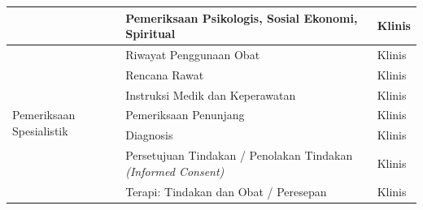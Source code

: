 \documentclass[bahasa, 12pt, a4paper, onecolumn, oneside, final]{report}
\begin{document}
\begin{longtable}{|p{4cm}|p{5.2cm}|p{3.2cm}|}
	                              & Pemeriksaan Psikologis, Sosial Ekonomi, Spiritual
	                              & Klinis                                                                \\ \hline

	\multirow{9}{4cm}{Pemeriksaan Spesialistik}
	                              & Riwayat Penggunaan Obat
	                              & Klinis                                                                \\ \cline{2-3}

	                              & Rencana Rawat
	                              & Klinis                                                                \\ \cline{2-3}

	                              & Instruksi Medik dan Keperawatan
	                              & Klinis                                                                \\ \cline{2-3}

	                              & Pemeriksaan Penunjang
	                              & Klinis                                                                \\ \cline{2-3}

	                              & Diagnosis
	                              & Klinis                                                                \\ \cline{2-3}

	                              & Persetujuan Tindakan / Penolakan Tindakan \textit{(Informed Consent)}
	                              & Klinis                                                                \\ \cline{2-3}

	                              & Terapi: Tindakan dan Obat / Peresepan
	                              & Klinis                                                                \\ \hline
\end{longtable}
\end{document}
